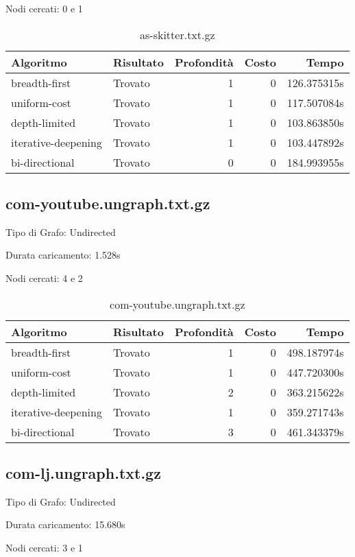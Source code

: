 Nodi cercati: 0 e 1

\begin{table}[h]
\centering
\begin{tabular}{|l|l|r|r|r|}
\hline
\textbf{Algoritmo} & \textbf{Risultato} & \textbf{Profondità} & \textbf{Costo} & \textbf{Tempo} \\
 \hline
breadth-first & Trovato & 1 & 0 & 126.375315s \\
uniform-cost & Trovato & 1 & 0 & 117.507084s \\
depth-limited & Trovato & 1 & 0 & 103.863850s \\
iterative-deepening & Trovato & 1 & 0 & 103.447892s \\
bi-directional & Trovato & 0 & 0 & 184.993955s \\
\hline
\end{tabular}
\caption{as-skitter.txt.gz}
\end{table}
\subsection{com-youtube.ungraph.txt.gz}
Tipo di Grafo: Undirected

Durata caricamento: 1.528s

Nodi cercati: 4 e 2

\begin{table}[h]
\centering
\begin{tabular}{|l|l|r|r|r|}
\hline
\textbf{Algoritmo} & \textbf{Risultato} & \textbf{Profondità} & \textbf{Costo} & \textbf{Tempo} \\
 \hline
breadth-first & Trovato & 1 & 0 & 498.187974s \\
uniform-cost & Trovato & 1 & 0 & 447.720300s \\
depth-limited & Trovato & 2 & 0 & 363.215622s \\
iterative-deepening & Trovato & 1 & 0 & 359.271743s \\
bi-directional & Trovato & 3 & 0 & 461.343379s \\
\hline
\end{tabular}
\caption{com-youtube.ungraph.txt.gz}
\end{table}
\subsection{com-lj.ungraph.txt.gz}
Tipo di Grafo: Undirected

Durata caricamento: 15.680s

Nodi cercati: 3 e 1

